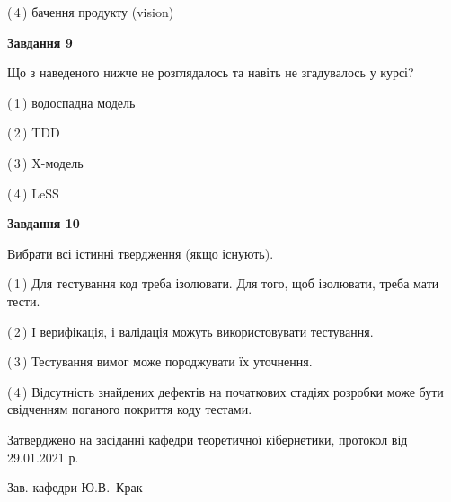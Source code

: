 \documentclass[10pt, ukrainian]{article}
\begin{document}
{\begin {large}
(\,4\,) бачення продукту (vision) %


{\begin {center}\textbf{Завдання 9}\end {center}}\par
Що з наведеного нижче не розглядалось та навіть не згадувалось у курсі?\par
\vspace{2mm}



(\,1\,) водоспадна модель%



(\,2\,) TDD%



(\,3\,) X-модель%



(\,4\,) LeSS%


{\begin {center}\textbf{Завдання 10}\end {center}}\par
Вибрати всі істинні твердження (якщо існують).\par
\vspace{2mm}



(\,1\,) Для тестування код треба ізолювати. Для того, щоб ізолювати, треба мати тести.%



(\,2\,) І верифікація, і валідація можуть використовувати тестування.%



(\,3\,) Тестування вимог може породжувати їх уточнення.%



(\,4\,) Відсутність знайдених дефектів на початкових стадіях розробки може бути свідченням поганого покриття коду тестами.%



\end {large}}
{\vspace{5mm}\smallskip \begin {small} Затверджено на засіданні кафедри теоретичної кібернетики, протокол  від   29.01.2021 р.\par\smallskip\smallskip
{\parbox {6.5 cm}{Зав. кафедри \dotfill Ю.В.~Крак}} \end{small}}
\newpage
\end{document}
